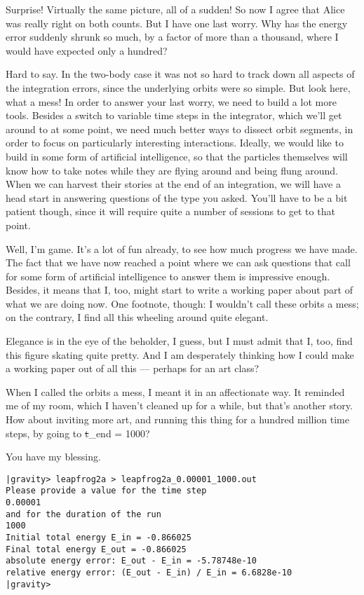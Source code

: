 \bob
Surprise!  Virtually the same picture, all of a sudden!  So now I
agree that Alice was really right on both counts.  But I have one last
worry.  Why has the energy error suddenly shrunk so much, by a factor
of more than a thousand, where I would have expected only a hundred?

\alice
Hard to say.  In the two-body case it was not so hard to track down
all aspects of the integration errors, since the underlying orbits
were so simple.  But look here, what a mess!  In order to answer
your last worry, we need to build a lot more tools.  Besides a switch
to variable time steps in the integrator, which we'll get around to at
some point, we need much better ways to dissect orbit segments, in
order to focus on particularly interesting interactions.  Ideally, we
would like to build in some form of artificial intelligence, so that
the particles themselves will know how to take notes while they are
flying around and being flung around.  When we can harvest their
stories at the end of an integration, we will have a head start in
answering questions of the type you asked.  You'll have to be a bit
patient though, since it will require quite a number of sessions to
get to that point.

\carol
Well, I'm game.  It's a lot of fun already, to see how much progress
we have made.  The fact that we have now reached a point where we can
ask questions that call for some form of artificial intelligence to
answer them is impressive enough.  Besides, it means that I, too,
might start to write a working paper about part of what we are doing
now.  One footnote, though: I wouldn't call these orbits a mess; on
the contrary, I find all this wheeling around quite elegant.

\bob
Elegance is in the eye of the beholder, I guess, but I must admit that
I, too, find this figure skating quite pretty.  And I am desperately
thinking how I could make a working paper out of all this --- perhaps
for an art class?

\alice
When I called the orbits a mess, I meant it in an affectionate way.
It reminded me of my room, which I haven't cleaned up for a while, but
that's another story.  How about inviting more art, and running this
thing for a hundred million time steps, by going to {\st t\_end = 1000}?

\bob
You have my blessing.

\cba

\begin{small}
\begin{verbatim}
|gravity> leapfrog2a > leapfrog2a_0.00001_1000.out
Please provide a value for the time step
0.00001
and for the duration of the run
1000
Initial total energy E_in = -0.866025
Final total energy E_out = -0.866025
absolute energy error: E_out - E_in = -5.78748e-10
relative energy error: (E_out - E_in) / E_in = 6.6828e-10
|gravity>
\end{verbatim}
\end{small}

